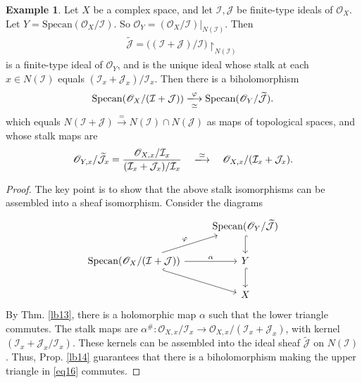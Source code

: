\documentclass[12pt,b5paper,notitlepage]{report}
\theoremstyle{definition}
\newtheorem{eg}[df]{Example}
\theoremstyle{plain}
\newcommand{\mc}{\mathcal}
\newcommand{\wtd}{\widetilde}
\newcommand{\scr}{\mathscr}
\newcommand{\Specan}{\mathrm{Specan}}
\newcommand{\uph}{\upharpoonright}
\numberwithin{equation}{section}
\begin{document}
\begin{eg}\label{lb23}
Let $X$ be a complex space, and let $\mc I,\mc J$ be finite-type ideals of $\scr O_X$. Let $Y=\Specan(\scr O_X/\mc I)$. So $\scr O_Y=(\scr O_X/\mc I)|_{N(\mc I)}$. Then
\begin{align*}
\wtd {\mc J}=\big((\mc I+\mc J)/\mc I\big)\uph_{N(\mc I)}
\end{align*}
is a finite-type ideal of $\scr O_Y$, and is the unique ideal whose stalk at each $x\in N(\mc I)$ equals $(\mc I_x+\mc J_x)/\mc I_x$. Then there is a biholomorphism
\begin{align}
\Specan(\scr O_X/(\mc I+\mc J))\xlongrightarrow[\simeq]{\varphi} \Specan(\scr O_Y/\wtd{\mc J}).
\end{align}
which equals $N(\mc I+\mc J)\xrightarrow{=}N(\mc I)\cap N(\mc J)$ as maps of topological spaces, and whose stalk maps are
\begin{align*}
\scr O_{Y,x}/\wtd{\mc J}_x=\frac{\scr O_{X,x}/\mc I_x}{(\mc I_x+\mc J_x)/\mc I_x}\quad\xlongrightarrow{\simeq}\quad\scr O_{X,x}/(\mc I_x+\mc J_x).
\end{align*}
\end{eg}



\begin{proof}
The key point is to show that the above stalk isomorphisms can be assembled into a sheaf isomorphism. Consider the diagrams
\begin{equation}\label{eq16}
\begin{tikzcd}
                                             & \Specan(\scr O_Y/\wtd{\mc J}) \arrow[d, hook] \\
\Specan(\scr O_X/(\mc I+\mc J)) \arrow[r, "\alpha"] \arrow[rd,hook ] \arrow[ru,"\varphi"] & Y \arrow[d, hook] \\
                                             & X                
\end{tikzcd}
\end{equation}
By Thm. \ref{lb13}, there is a holomorphic map $\alpha$ such that the lower triangle commutes. The stalk maps are $\alpha^\#:\scr O_{X,x}/\mc I_x\rightarrow\scr O_{X,x}/(\mc I_x+\mc J_x)$, with kernel $(\mc I_x+\mc J_x/\mc I_x)$. These kernels can be assembled into the ideal sheaf $\wtd{\mc J}$ on $N(\mc I)$. Thus, Prop. \ref{lb14} guarantees that there is a biholomorphism making the upper triangle in \eqref{eq16} commutes.
\end{proof}
\end{document}
